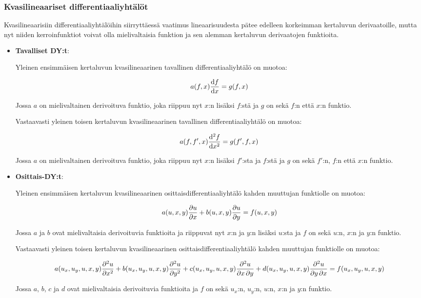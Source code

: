 \documentclass[../johdoksia.tex]{subfiles}
\begin{document}
	\subsubsection{Kvasilineaariset differentiaaliyhtälöt}
	
	Kvasilineaarisiin differentiaaliyhtälöihin siirryttäessä vaatimus lineaarisuudesta pätee edelleen korkeimman kertaluvun derivaatoille, mutta nyt niiden kerroinfunktiot voivat olla mielivaltaisia funktion ja sen alemman kertaluvun derivaatojen funktioita. 
	
	\begin{itemize}
		\item \textbf{Tavalliset DY:t}:
		
		Yleinen ensimmäisen kertaluvun kvasilineaarinen tavallinen differentiaaliyhtälö on muotoa:
		
		\begin{equation}
			a(f, x)\odv{f}{x} = g(f, x)
		\end{equation}
		
		Jossa $a$ on mielivaltainen derivoituva funktio, joka riippuu nyt $x$:n lisäksi $f$:stä ja $g$ on sekä $f$:n että $x$:n funktio.
		
		Vastaavasti yleinen toisen kertaluvun kvasilineaarinen tavallinen differentiaaliyhtälö on muotoa:
		
		\begin{equation}
			a(f, f', x)\odv{^2f}{x^2} =  g(f', f, x)
		\end{equation}
		
		Jossa $a$ on mielivaltainen derivoituva funktio, joka riippuu nyt $x$:n lisäksi $f'$:sta ja $f$:stä ja $g$ on sekä $f'$:n, $f$:n että $x$:n funktio.
		
		\item \textbf{Osittais-DY:t}:
		
		Yleinen ensimmäisen kertaluvun kvasilineaarinen osittaisdifferentiaaliyhtälö kahden muuttujan funktiolle on muotoa:
		
		\begin{equation}
			a(u, x, y)\pdv{u}{x} + b(u, x, y)\pdv{u}{y} = f(u, x, y)
		\end{equation}
		
		Jossa $a$ ja $b$ ovat mielivaltaisia derivoituvia funktioita ja riippuvat nyt $x$:n ja $y$:n lisäksi $u$:sta ja $f$ on sekä $u$:n, $x$:n ja $y$:n funktio.
		
		Vastaavasti yleinen toisen kertaluvun kvasilineaarinen osittaisdifferentiaaliyhtälö kahden muuttujan funktiolle on muotoa:
		
		\begin{equation}
			a(u_x, u_y, u, x,y)\pdv[order = 2]{u}{x} + b(u_x, u_y, u, x,y)\pdv[order = 2]{u}{y} + c(u_x, u_y, u, x, y)\pdv{u}{x,y} + d(u_x, u_y, u, x, y)\pdv{u}{y,x} = f(u_x, u_y, u, x, y)
		\end{equation}
		
		Jossa $a$, $b$, $c$ ja $d$ ovat mielivaltaisia derivoituvia funktioita ja $f$ on sekä $u_x$:n, $u_y$:n, $u$:n, $x$:n ja $y$:n funktio.
	\end{itemize}
	
\end{document}
